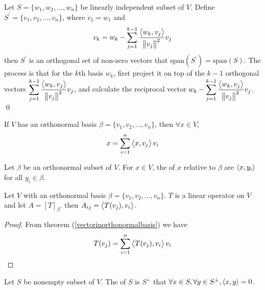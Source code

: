 \begin{definition}
	Let $S=\{w_1, w_2, \dots, w_n \}$ be linearly independent subset of $V$. Define $S^\prime=\{v_1,v_2,\dots,v_n  \}$, where $v_1=w_1$ and 
	\begin{equation}
		v_k = w_k - \sum_{j=1}^{k-1} \frac{\left\langle \displaystyle w_k, v_j \right\rangle}{\norm{v_j}^2} v_j
	\end{equation}
	then $S^\prime$ is an orthogonal set of non-zero vectors that $\text{span}(S^\prime) = \text{span}(S)$. The process is that for the $k$th basis $w_k$, first project it on top of the $k-1$ orthogonal vectors $\displaystyle \sum_{j=1}^{k-1} \frac{\left\langle \displaystyle w_k, v_j \right\rangle}{\norm{v_j}^2} v_j$, and calculate the reciprocal vector $\displaystyle w_k - \sum_{j=1}^{k-1} \frac{\left\langle \displaystyle w_k, v_j \right\rangle}{\norm{v_j}^2} v_j$.
	\qed
\end{definition}

\begin{theorem}\label{vectorinorthonormalbasis}
	If $V$ has an orthonormal basis $\beta=\{v_1,v_2,\dots,v_n\}$, then $\forall x\in V$, 
	\begin{equation}
		x = \sum_{i=1}^n \left\langle \displaystyle x, v_j \right\rangle v_i
	\end{equation}
\end{theorem}

\begin{definition}
    Let $\beta$ be an orthonormal subset of $V$. For $x \in V$, the  of $x$ relative to $\beta$ are $\left\langle \displaystyle x, y_i \right\rangle$ for all $y_i \in \beta$.
\end{definition}


\begin{theorem}
	Let $V$ with an orthonormal basis $\beta=\{v_1,v_2,\dots,v_n\}$. $T$ is a linear operator on $V$ and let $A=[T]_\beta$. then $A_{ij}=\left\langle \displaystyle T(v_j), v_i \right\rangle$.
\end{theorem}
\begin{proof}
	From theorem (\ref{vectorinorthonormalbasis}) we have
	\begin{equation*}
		T(v_j) = \sum_{i=1}^n \left\langle \displaystyle T(v_j), v_i \right\rangle v_i
	\end{equation*}
\end{proof}

\begin{definition}
    Let $S$ be nonempty subset of $V$. The  of $S$ is $S^\bot$ that $\forall x \in S, \forall y \in S^\bot, \left\langle \displaystyle x, y \right\rangle = 0$.
\end{definition}

